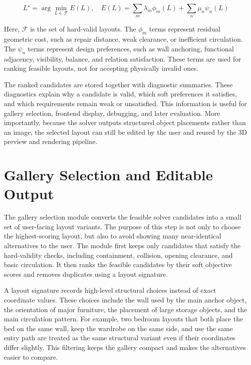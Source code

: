 \[
L^{\star} = \arg\min_{L \in \mathcal{F}} E(L), \quad
E(L) = \sum_m \lambda_m \phi_m(L) + \sum_n \mu_n \psi_n(L)
\]

Here, \(\mathcal{F}\) is the set of hard-valid layouts. The \(\phi_m\) terms represent residual geometric cost, such as repair distance, weak clearance, or inefficient circulation. The \(\psi_n\) terms represent design preferences, such as wall anchoring, functional adjacency, visibility, balance, and relation satisfaction. These terms are used for ranking feasible layouts, not for accepting physically invalid ones.

The ranked candidates are stored together with diagnostic summaries. These diagnostics explain why a candidate is valid, which soft preferences it satisfies, and which requirements remain weak or unsatisfied. This information is useful for gallery selection, frontend display, debugging, and later evaluation. More importantly, because the solver outputs structured object placements rather than an image, the selected layout can still be edited by the user and reused by the 3D preview and rendering pipeline.

\section{Gallery Selection and Editable Output}\label{sec:problem1-gallery-selection}

The gallery selection module converts the feasible solver candidates into a small set of user-facing layout variants. The purpose of this step is not only to choose the highest-scoring layout, but also to avoid showing many near-identical alternatives to the user. The module first keeps only candidates that satisfy the hard-validity checks, including containment, collision, opening clearance, and basic circulation. It then ranks the feasible candidates by their soft objective scores and removes duplicates using a layout signature.

A layout signature records high-level structural choices instead of exact coordinate values. These choices include the wall used by the main anchor object, the orientation of major furniture, the placement of large storage objects, and the main circulation pattern. For example, two bedroom layouts that both place the bed on the same wall, keep the wardrobe on the same side, and use the same entry path are treated as the same structural variant even if their coordinates differ slightly. This filtering keeps the gallery compact and makes the alternatives easier to compare.


